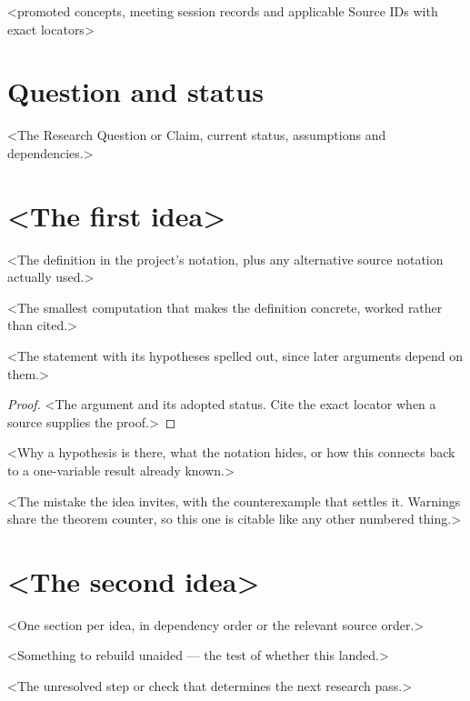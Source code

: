 \documentclass[a4paper,10pt]{article}
\begin{document}
%
  {<promoted concepts, meeting session records and applicable Source IDs with exact locators>}

\section{Question and status}
<The Research Question or Claim, current status, assumptions and dependencies.>

\section{<The first idea>}

\begin{defn}[<term>]
<The definition in the project's notation, plus any alternative source notation actually used.>
\end{defn}

\begin{example}
<The smallest computation that makes the definition concrete, worked rather than cited.>
\end{example}

\begin{thm}[<name>]
<The statement with its hypotheses spelled out, since later arguments depend on them.>
\end{thm}

\begin{proof}
<The argument and its adopted status. Cite the exact locator when a source supplies the proof.>
\end{proof}

\begin{remark}
<Why a hypothesis is there, what the notation hides, or how this connects back to a one-variable
result already known.>
\end{remark}

\begin{warning}
<The mistake the idea invites, with the counterexample that settles it. Warnings share the
theorem counter, so this one is citable like any other numbered thing.>
\end{warning}

\section{<The second idea>}
<One section per idea, in dependency order or the relevant source order.>

\begin{checkyourself}
  \item <Something to rebuild unaided --- the test of whether this landed.>
  \item <The unresolved step or check that determines the next research pass.>
\end{checkyourself}
\end{document}
